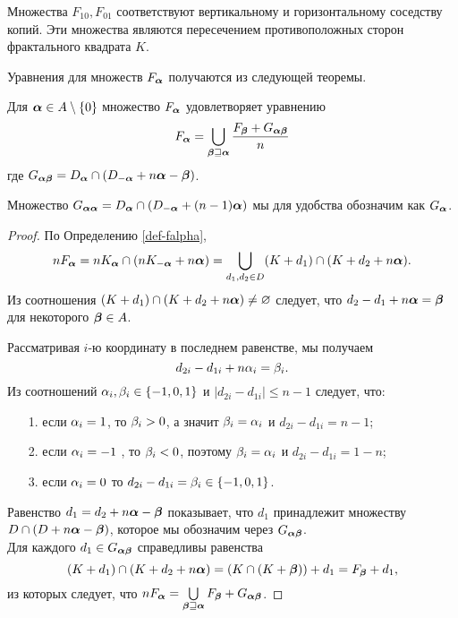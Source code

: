 Множества $F_{10}, F_{01}$ соответствуют вертикальному и горизонтальному соседству копий. 
Эти множества являются пересечением противоположных сторон фрактального квадрата $K$.

Уравнения для множеств $F_{\bm{\alpha}}$ получаются из следующей теоремы.

\begin{theorem}\label{thm:falpha}
Для ${\bm{\alpha}}\in A\setminus\{0\}$ множество $F_{\bm{\alpha}}$ удовлетворяет уравнению
\begin{equation}\label{sideint}
F_{\bm{\alpha}}=\bigcup\limits_{{\bm{\beta}}\sqsupseteq{\bm{\alpha}}} \dfrac{F_{\bm{\beta}}+G_{{\bm{\alpha}}{\bm{\beta}}}}{n}
\end{equation}
где $G_{{\bm{\alpha}}{\bm{\beta}}}=D_{\bm{\alpha}}\cap(D_{-{\bm{\alpha}}}+n{\bm{\alpha}}-{\bm{\beta}})$.
\end{theorem}

Множество $G_{{\bm{\alpha}}{\bm{\alpha}}}=D_{\bm{\alpha}}\cap(D_{-{\bm{\alpha}}}+(n-1){\bm{\alpha}})$ мы для удобства обозначим как $G_{{\bm{\alpha}}}$.

\begin{proof}
По Определению \ref{def-falpha},
\begin{equation}\label{line}
nF_{\bm{\alpha}}=nK_{\bm{\alpha}} \cap (nK_{-{\bm{\alpha}}}+n{\bm{\alpha}})= 
\bigcup\limits_{d_1,d_2\in D}(K+d_1)\cap (K+d_2+n{\bm{\alpha}}).
\end{equation}
Из соотношения $(K+d_1)\cap (K+d_2+n{\bm{\alpha}})\neq\varnothing$ следует, что $d_2-d_1+n{\bm{\alpha}}={\bm{\beta}}$ для некоторого ${\bm{\beta}}\in A$.

Рассматривая $i$-ю координату в последнем равенстве, мы получаем
$$d_{2i}-d_{1i}+n\alpha_i=\beta_i.$$ 
Из соотношений $\alpha_i,\beta_i\in\{-1,0,1\}$ и $|d_{2i}-d_{1i}|\le n-1$ следует, что: \medskip
\begin{itemize}[nolistsep]
 \item[1.] если $\alpha_i=1$, то $\beta_i>0$, а значит $\beta_i=\alpha_i$ и $d_{2i}-d_{1i}=n-1$;
 \item[2.] если $\alpha_i=-1$ , то $\beta_i<0$, поэтому $\beta_i=\alpha_i$ и $d_{2i}-d_{1i}=1-n$;
 \item[3.] если $\alpha_i=0$ то $d_{2i}-d_{1i}=\beta_i\in\{-1,0,1\}$.
\end{itemize} 
\medskip

Равенство $d_1=d_2+n{\bm{\alpha}}-{\bm{\beta}}$ показывает, что $d_1$ принадлежит множеству $D\cap(D+n{\bm{\alpha}}-{\bm{\beta}})$, которое мы обозначим через $G_{{\bm{\alpha}}{\bm{\beta}}}$.\\
Для каждого $d_1\in G_{{\bm{\alpha}}{\bm{\beta}}}$ справедливы равенства $$(K+d_1)\cap (K+d_2+n{\bm{\alpha}})= (K\cap(K+{\bm{\beta}}))+d_1= F_{\bm{\beta}}+d_1,$$ из которых следует, что $nF_{\bm{\alpha}}= \bigcup\limits_{{\bm{\beta}}\sqsupseteq{\bm{\alpha}}} {F_{\bm{\beta}}+G_{{\bm{\alpha}}{\bm{\beta}}}}$.
\end{proof}

